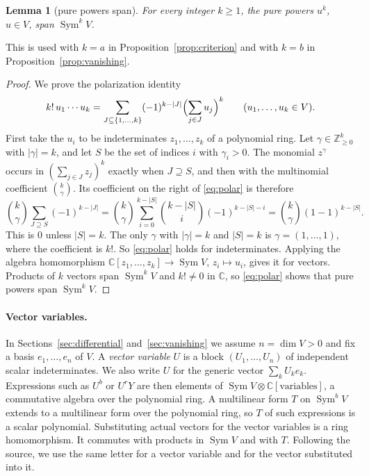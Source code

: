 \documentclass[11pt]{article}
\newtheorem{lemma}[theorem]{Lemma}
\theoremstyle{remark}
\DeclareMathOperator{\Sym}{Sym}
\newcommand{\C}{\mathbb C}
\begin{document}
\begin{lemma}[pure powers span]\label{lem:powers}
For every integer $k\ge1$, the pure powers $u^k$, $u\in V$, span $\Sym^kV$.
\end{lemma}
This is used with $k=a$ in Proposition~\ref{prop:criterion} and with $k=b$
in Proposition~\ref{prop:vanishing}.
\begin{proof}
We prove the polarization identity
\begin{equation}\label{eq:polar}
 k!\,u_1\cdots u_k
 =\sum_{J\subseteq\{1,\ldots,k\}}(-1)^{k-|J|}
 \Bigl(\sum_{j\in J}u_j\Bigr)^k
 \qquad(u_1,\ldots,u_k\in V).
\end{equation}
First take the $u_i$ to be indeterminates $z_1,\ldots,z_k$ of a polynomial
ring. Let $\gamma\in\mathbb Z_{\ge0}^k$ with $|\gamma|=k$, and let $S$ be
the set of indices $i$ with $\gamma_i>0$. The monomial $z^\gamma$ occurs in
$(\sum_{j\in J}z_j)^k$ exactly when $J\supseteq S$, and then with the
multinomial coefficient $\binom{k}{\gamma}$. Its coefficient on the right
of \eqref{eq:polar} is therefore
\[
 \binom k\gamma\sum_{J\supseteq S}(-1)^{k-|J|}
 =\binom k\gamma\sum_{i=0}^{k-|S|}\binom{k-|S|}{i}(-1)^{k-|S|-i}
 =\binom k\gamma(1-1)^{k-|S|}.
\]
This is $0$ unless $|S|=k$. The only $\gamma$ with $|\gamma|=k$ and
$|S|=k$ is $\gamma=(1,\ldots,1)$, where the coefficient is $k!$. So
\eqref{eq:polar} holds for indeterminates. Applying the algebra
homomorphism $\C[z_1,\ldots,z_k]\to\Sym V$, $z_i\mapsto u_i$, gives it for
vectors. Products of $k$ vectors span $\Sym^kV$ and $k!\ne0$ in $\C$, so
\eqref{eq:polar} shows that pure powers span $\Sym^kV$.
\end{proof}

\paragraph{Vector variables.}
In Sections~\ref{sec:differential} and~\ref{sec:vanishing} we assume
$n=\dim V>0$ and fix a basis $e_1,\ldots,e_n$ of $V$. A \emph{vector
variable} $U$ is a block $(U_1,\ldots,U_n)$ of independent scalar
indeterminates. We also write $U$ for the generic vector $\sum_kU_ke_k$.
Expressions such as $U^b$ or $U^rY$ are then elements of
$\Sym V\otimes\C[\text{variables}]$, a commutative algebra over the
polynomial ring. A multilinear form $T$ on $\Sym^bV$ extends to a
multilinear form over the polynomial ring, so $T$ of such expressions is a
scalar polynomial. Substituting actual vectors for the vector variables is
a ring homomorphism. It commutes with products in $\Sym V$ and with $T$.
Following the source, we use the same letter for a vector variable and for
the vector substituted into it.
\end{document}
